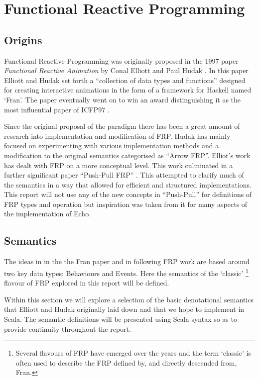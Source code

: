 \chapter{Functional Reactive Programming}
  \section{Origins}
    Functional Reactive Programming was originally proposed in the 1997 paper \emph{Functional
    Reactive Animation} by Conal Elliott and Paul Hudak \cite{Elliott1997}. In this paper Elliott and Hudak
    set forth a ``collection of data types and functions'' designed for creating interactive 
    animations in the form of a framework for Haskell named `Fran'. The paper eventually went on to
    win an award distinguishing it as the most influential paper of ICFP97 \cite{SIGPLAN}. 
    
    Since the original proposal of the paradigm there has been a great amount of research
    into implementation and modification of FRP. Hudak has mainly focused on experimenting with various
    implementation methods and a modification to the original semantics categorised as ``Arrow FRP''. Elliot's
    work has dealt with FRP on a more conceptual level. This work culminated in a further significant paper
    ``Push-Pull FRP'' \cite{Elliott2009}. This attempted to clarify much of the semantics in a way that allowed for efficient 
    and
    structured implementations. This report will not use any of the new concepts in ``Push-Pull'' for definitions
    of FRP types and operation but inspiration was taken from it for many aspects of the implementation of Echo.

  \section{Semantics}
    The ideas in in the the Fran paper and in following FRP work are based around two key data types: 
    Behaviours and Events. Here the semantics of the `classic' \footnote{Several
    flavours of FRP have emerged over the years and the term `classic' is often used to describe
    the FRP defined by, and directly descended from, Fran.} flavour of FRP explored in this report will be defined.
    
    Within this section we will explore a selection of the basic denotational semantics that Elliott
    and Hudak originally laid down and that we hope to implement in Scala. The semantic definitions will
    be presented using Scala syntax so as to provide continuity throughout the report.
  
